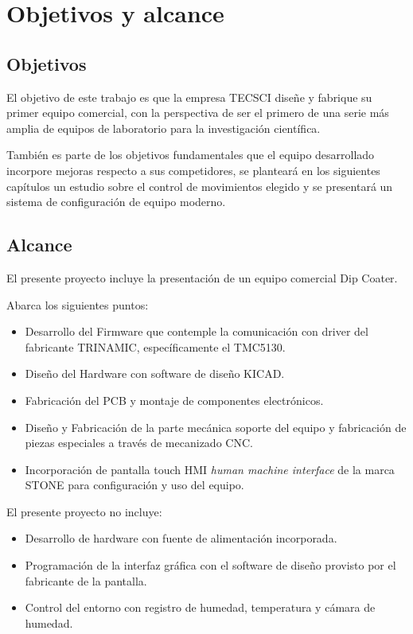 
\section{Objetivos y alcance}

\subsection{Objetivos}

El objetivo de este trabajo es que la empresa TECSCI diseñe y fabrique su primer equipo comercial, con la perspectiva de ser el primero de una serie más amplia de equipos de laboratorio para la investigación científica.

También es parte de los objetivos fundamentales que el equipo desarrollado incorpore mejoras respecto a sus competidores, se planteará en los siguientes capítulos un estudio sobre el control de movimientos elegido y se presentará un sistema de configuración de equipo moderno. 

\subsection{Alcance}

El presente proyecto incluye la presentación de un equipo comercial Dip Coater. 

Abarca los siguientes puntos:

\begin{itemize}
\item Desarrollo del Firmware que contemple la comunicación con driver del fabricante TRINAMIC, específicamente el TMC5130.
\item Diseño del Hardware con software de diseño KICAD.
\item Fabricación del PCB y montaje de componentes electrónicos.
\item Diseño y Fabricación de la parte mecánica soporte del equipo y fabricación de piezas especiales a través de mecanizado CNC.
\item Incorporación de pantalla touch HMI \textit{human machine interface} de la marca STONE para configuración y uso del equipo.
\end{itemize}



El presente proyecto no incluye:

\begin{itemize}
\item Desarrollo de hardware con fuente de alimentación incorporada.
\item Programación de la interfaz gráfica con el software de diseño provisto por el fabricante de la pantalla.
\item Control del entorno con registro de humedad, temperatura y  cámara de humedad.
\end{itemize}



